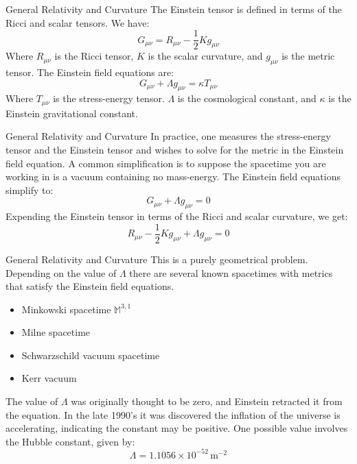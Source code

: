 \documentclass{beamer}
\begin{document}
    \begin{frame}{General Relativity and Curvature}
        The Einstein tensor is defined in terms of the Ricci and scalar tensors.
        We have:
        \begin{equation}
            G_{\mu\nu}=R_{\mu\nu}-\frac{1}{2}Kg_{\mu\nu}
        \end{equation}
        Where $R_{\mu\nu}$ is the Ricci tensor, $K$ is the scalar curvature,
        and $g_{\mu\nu}$ is the metric tensor. The Einstein field equations are:
        \begin{equation}
            G_{\mu\nu}+\Lambda{g}_{\mu\nu}=\kappa{T}_{\mu\nu}
        \end{equation}
        Where $T_{\mu\nu}$ is the stress-energy tensor. $\Lambda$ is the
        cosmological constant, and $\kappa$ is the Einstein gravitational
        constant.
    \end{frame}
    \begin{frame}{General Relativity and Curvature}
        In practice, one measures the stress-energy tensor and the Einstein
        tensor and wishes to solve for the metric in the Einstein field
        equation. A common simplification is to suppose the spacetime you are
        working in is a vacuum containing no mass-energy. The Einstein field
        equations simplify to:
        \begin{equation}
            G_{\mu\nu}+\Lambda{g}_{\mu\nu}=0
        \end{equation}
        Expending the Einstein tensor in terms of the Ricci and scalar
        curvature, we get:
        \begin{equation}
            R_{\mu\nu}-\frac{1}{2}Kg_{\mu\nu}+\Lambda{g}_{\mu\nu}=0
        \end{equation}
    \end{frame}
    \begin{frame}{General Relativity and Curvature}
        This is a purely geometrical problem. Depending on the value of
        $\Lambda$ there are several known spacetimes with metrics that satisfy
        the Einstein field equations.
        \begin{itemize}
            \item Minkowski spacetime $\mathbb{M}^{3,1}$
            \item Milne spacetime
            \item Schwarzschild vacuum spacetime
            \item Kerr vacuum
        \end{itemize}
        The value of $\Lambda$ was originally thought to be zero, and Einstein
        retracted it from the equation. In the late 1990's it was discovered
        the inflation of the universe is accelerating, indicating the constant
        may be positive. One possible value involves the Hubble constant, given
        by:
        \begin{equation}
            \Lambda=1.1056\times{10}^{-52}\,\textrm{m}^{-2}
        \end{equation}
    \end{frame}
\end{document}
